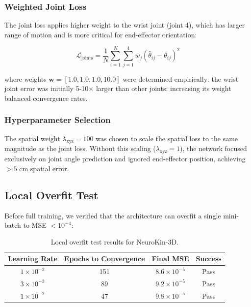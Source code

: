 \documentclass[12pt,a4paper,oneside]{report}
\begin{document}
\subsubsection{Weighted Joint Loss}
\label{subsubsec:weighted_joint_loss}

The joint loss applies higher weight to the wrist joint (joint 4), which has larger range of motion and is more critical for end-effector orientation:

\begin{equation}
\mathcal{L}_{\text{joints}} = \frac{1}{N} \sum_{i=1}^{N} \sum_{j=1}^{4} w_j (\hat{\theta}_{ij} - \theta_{ij})^2
\end{equation}

where weights $\mathbf{w} = [1.0, 1.0, 1.0, 10.0]$ were determined empirically: the wrist joint error was initially 5-10$\times$ larger than other joints; increasing its weight balanced convergence rates.

\subsubsection{Hyperparameter Selection}
\label{subsubsec:hyperparameter_selection}

The spatial weight $\lambda_{\text{xyz}} = 100$ was chosen to scale the spatial loss to the same magnitude as the joint loss. Without this scaling ($\lambda_{\text{xyz}} = 1$), the network focused exclusively on joint angle prediction and ignored end-effector position, achieving $>5$ cm spatial error.

\subsection{Local Overfit Test}
\label{subsec:local_overfit_test}

Before full training, we verified that the architecture can overfit a single mini-batch to MSE $< 10^{-4}$:

\begin{table}[H]
\centering
\caption{Local overfit test results for NeuroKin-3D.}
\label{tab:overfit_test}
\begin{tabular}{cccc}
\toprule
Learning Rate & Epochs to Convergence & Final MSE & Success \\
\midrule
$1 \times 10^{-3}$ & 151 & $8.6 \times 10^{-5}$ & Pass \\
$3 \times 10^{-3}$ & 89 & $9.2 \times 10^{-5}$ & Pass \\
$1 \times 10^{-2}$ & 47 & $9.8 \times 10^{-5}$ & Pass \\
\bottomrule
\end{tabular}
\end{table}
\end{document}
